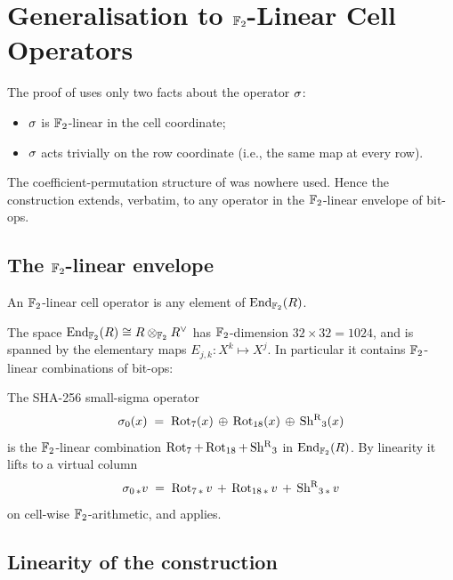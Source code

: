 \section{Generalisation to $\mathbb{F}_2$-Linear Cell Operators}
\label{sec:generalisation}

The proof of  uses only two facts about the
operator $\sigma$:
\begin{itemize}[leftmargin=2em]
  \item $\sigma$ is $\mathbb{F}_2$-linear in the cell coordinate;
  \item $\sigma$ acts trivially on the row coordinate (i.e., the same
    map at every row).
\end{itemize}
The coefficient-permutation structure of  was nowhere
used. Hence the construction extends, verbatim, to any operator in the
$\mathbb{F}_2$-linear envelope of bit-ops.

\subsection{The $\mathbb{F}_2$-linear envelope}

\begin{definition}
\label{def:f2-linear-op}
An $\mathbb{F}_2$-linear cell operator is any element of $\operatorname{End}_{\mathbb{F}_2}(R)$.
\end{definition}

The space $\operatorname{End}_{\mathbb{F}_2}(R) \cong R \otimes_{\mathbb{F}_2}
R^{\vee}$ has $\mathbb{F}_2$-dimension $32 \times 32 = 1024$, and is
spanned by the elementary maps $E_{j,k} : X^k \mapsto X^j$. In
particular it contains $\mathbb{F}_2$-linear combinations of bit-ops:

\begin{example}
\label{ex:sigma-0}
The SHA-256 small-sigma operator
\[
  \sigma_0(x) \;=\; \operatorname{Rot}_7(x) \,\oplus\, \operatorname{Rot}_{18}(x) \,\oplus\, \operatorname{Sh^{R}}_3(x)
\]
is the $\mathbb{F}_2$-linear combination $\operatorname{Rot}_7 + \operatorname{Rot}_{18} + \operatorname{Sh^{R}}_3$
in $\operatorname{End}_{\mathbb{F}_2}(R)$. By linearity it lifts to a virtual column
\[
  \sigma_{0\,*} v \;=\; \operatorname{Rot}_{7\,*} v \,+\, \operatorname{Rot}_{18\,*} v \,+\, \operatorname{Sh^{R}}_{3\,*} v
\]
on cell-wise $\mathbb{F}_2$-arithmetic, and
 applies.
\end{example}

\subsection{Linearity of the construction}

